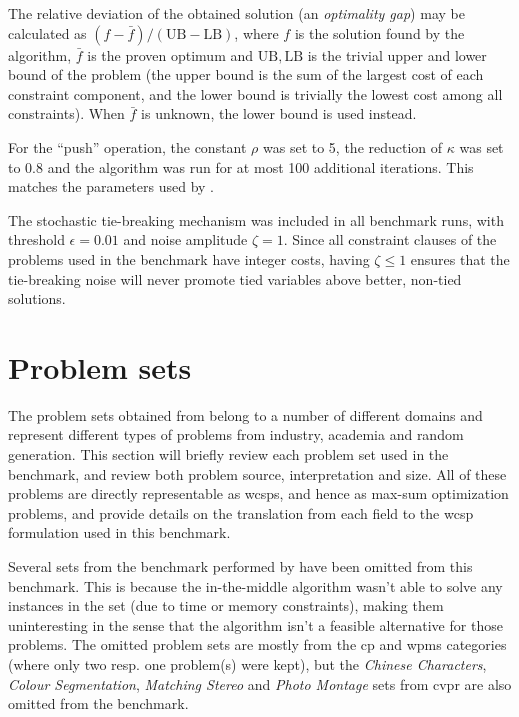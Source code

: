 \label{pg:bench-method}
The relative deviation of the obtained solution (an \emph{optimality gap}) may be calculated as \((f - \bar{f})/(\mathrm{UB}-\mathrm{LB})\), where \(f\) is the solution found by the algorithm, \(\bar{f}\) is the proven optimum and \(\mathrm{UB}, \mathrm{LB}\) is the trivial upper and lower bound of the problem (the upper bound is the sum of the largest cost of each constraint component, and the lower bound is trivially the lowest cost among all constraints).
When \(\bar{f}\) is unknown, the lower bound is used instead.

For the \enquote{push} operation, the constant \(\rho\) was set to \num{5}, the reduction of \(\kappa\) was set to \num{0.8} and the algorithm was run for at most \num{100} additional iterations.
This matches the parameters used by \textcite{Bastert10}.

The stochastic tie-breaking mechanism was included in all benchmark runs, with threshold \(\epsilon=\num{0.01}\) and noise amplitude \(\zeta=1\).
Since all constraint clauses of the problems used in the benchmark have integer costs, having \(\zeta\leq1\) ensures that the tie-breaking noise will never promote tied variables above better, non-tied solutions.

\section{Problem sets}
The problem sets obtained from \textcite{deGivry14} belong to a number of different domains and represent different types of problems from industry, academia and random generation.
This section will briefly review each problem set used in the benchmark, and review both problem source, interpretation and size.
All of these problems are directly representable as \glspl{wcsp}, and hence as max-sum optimization problems, and \textcite{deGivry14} provide details on the translation from each field to the \gls{wcsp} formulation used in this benchmark.

Several sets from the benchmark performed by \textcite{deGivry14} have been omitted from this benchmark.
This is because the in-the-middle algorithm wasn't able to solve any instances in the set (due to time or memory constraints), making them uninteresting in the sense that the algorithm isn't a feasible alternative for those problems.
The omitted problem sets are mostly from the \gls{cp} and \gls{wpms} categories (where only two resp. one problem(s) were kept), but the \emph{Chinese Characters}, \emph{Colour Segmentation}, \emph{Matching Stereo} and \emph{Photo Montage} sets from \gls{cvpr} are also omitted from the benchmark.

